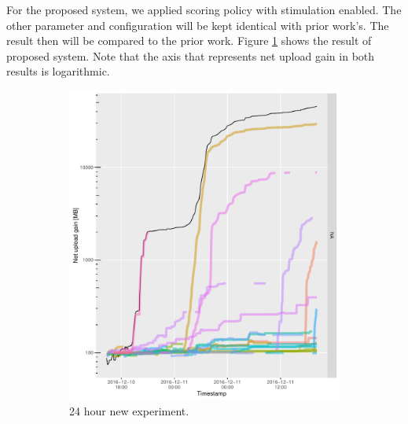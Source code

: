 For the proposed system, we applied scoring policy with stimulation enabled. The other parameter and configuration will be kept identical with prior work's. The result then will be compared to the prior work. Figure \ref{fig:newetree24} shows the result of proposed system. Note that the axis that represents net upload gain in both results is logarithmic.

\begin{figure}[h]
	\begin{adjustwidth}{-1.5cm}{}
		\begin{subfigure}[t]{0.6\textwidth}
			\centering
			\includegraphics[width=\textwidth]{pics/results/b136.pdf}
			\caption{24 hour new experiment.}
			\label{fig:newetree24}
		\end{subfigure}
		~
		\begin{subfigure}[t]{0.6\textwidth}
			\centering

\end{subfigure}
\end{adjustwidth}
\end{figure}
